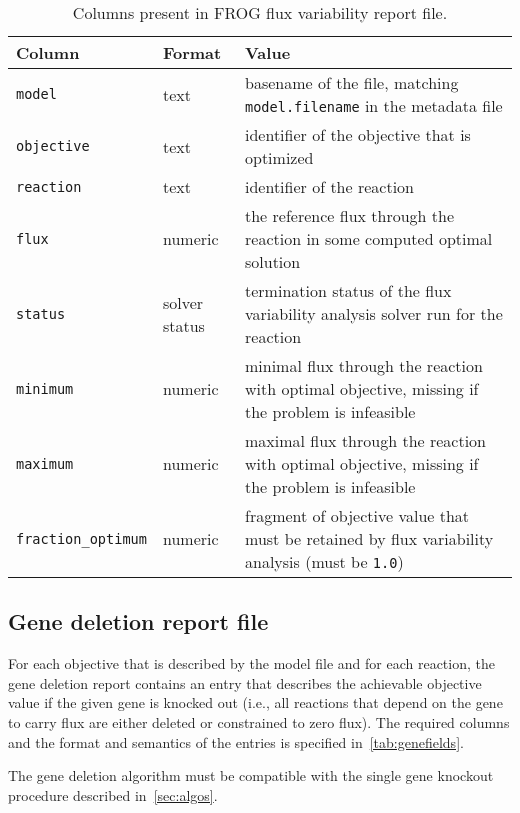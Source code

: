\begin{table}[p]\tablefont
\begin{tabular}{llp{30em}}
\toprule
Column & Format & Value \\
\midrule
\verb|model|
 & text
 & basename of the file, matching \verb|model.filename| in the metadata file
 \\
\verb|objective|
 & text
 & identifier of the objective that is optimized
 \\
\verb|reaction|
 & text
 & identifier of the reaction
 \\
\verb|flux|
 & numeric
 & the reference flux through the reaction in some computed optimal solution
 \\
\verb|status|
 & solver status
 & termination status of the flux variability analysis solver run for the reaction
 \\
\verb|minimum|
 & numeric
 & minimal flux through the reaction with optimal objective, missing if the problem is infeasible
 \\
\verb|maximum|
 & numeric
 & maximal flux through the reaction with optimal objective, missing if the problem is infeasible
 \\
\verb|fraction_optimum|
 & numeric
 & fragment of objective value that must be retained by flux variability analysis (must be \verb|1.0|)
 \\
\bottomrule
\end{tabular}
\caption{Columns present in FROG flux variability report file.}
\label{tab:fvafields}
\end{table}

\subsection{Gene deletion report file}
\label{sec:genes}

For each objective that is described by the model file and for each reaction, the gene deletion report contains an entry that describes the achievable objective value if the given gene is knocked out (i.e., all reactions that depend on the gene to carry flux are either deleted or constrained to zero flux). The required columns and the format and semantics of the entries is specified in~\cref{tab:genefields}.

The gene deletion algorithm must be compatible with the single gene knockout procedure described in~\cref{sec:algos}.

